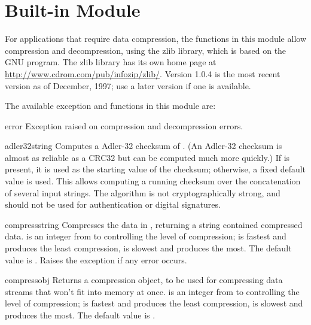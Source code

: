 
\section{Built-in Module }
\label{module-zlib}

For applications that require data compression, the functions in this
module allow compression and decompression, using the zlib library,
which is based on the GNU  program.  The zlib library
has its own home page at
\url{http://www.cdrom.com/pub/infozip/zlib/}.  Version 1.0.4 is the
most recent version as of December, 1997; use a later version if one
is available.

The available exception and functions in this module are:

\begin{excdesc}{error}
  Exception raised on compression and decompression errors.
\end{excdesc}


\begin{funcdesc}{adler32}{string}
   Computes a Adler-32 checksum of .  (An Adler-32
   checksum is almost as reliable as a CRC32 but can be computed much
   more quickly.)  If  is present, it is used as the
   starting value of the checksum; otherwise, a fixed default value is
   used.  This allows computing a running checksum over the
   concatenation of several input strings.  The algorithm is not
   cryptographically strong, and should not be used for
   authentication or digital signatures.
\end{funcdesc}

\begin{funcdesc}{compress}{string}
Compresses the data in , returning a string contained
compressed data.   is an integer from  to 
controlling the level of compression;  is fastest and produces
the least compression,  is slowest and produces the most.  The
default value is .  Raises the 
exception if any error occurs.
\end{funcdesc}

\begin{funcdesc}{compressobj}{}
  Returns a compression object, to be used for compressing data streams
  that won't fit into memory at once.   is an integer from
   to  controlling the level of compression;  is
  fastest and produces the least compression,  is slowest and
  produces the most.  The default value is .
\end{funcdesc}

